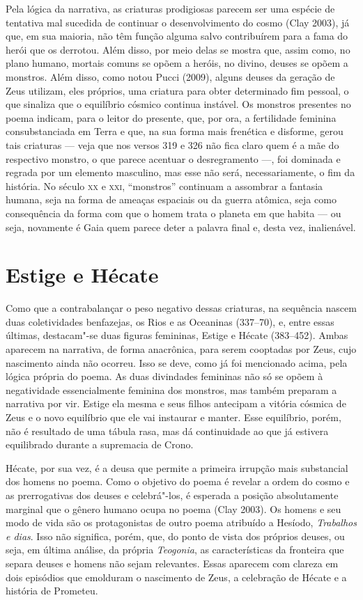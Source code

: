 Pela lógica da narrativa, as criaturas prodigiosas parecem ser uma
espécie de tentativa mal sucedida de continuar o desenvolvimento do
cosmo (Clay 2003), já que, em sua maioria, não têm função alguma salvo
contribuírem para a fama do herói que os derrotou. Além disso, por meio
delas se mostra que, assim como, no plano humano, mortais comuns se
opõem a heróis, no divino, deuses se opõem a monstros. Além disso, como
notou Pucci (2009), alguns deuses da geração de Zeus utilizam, eles
próprios, uma criatura para obter determinado fim pessoal, o que
sinaliza que o equilíbrio cósmico continua instável. Os monstros
presentes no poema indicam, para o leitor do presente, que, por ora, a
fertilidade feminina consubstanciada em Terra e que, na sua forma mais
frenética e disforme, gerou tais criaturas --- veja que nos versos 319 e
326 não fica claro quem é a mãe do respectivo monstro, o que parece
acentuar o desregramento ---, foi dominada e regrada por um elemento
masculino, mas esse não será, necessariamente, o fim da história. No
século \textsc{xx} e \textsc{xxi}, ``monstros'' continuam a assombrar a fantasia humana,
seja na forma de ameaças espaciais ou da guerra atômica, seja como
consequência da forma com que o homem trata o planeta em que habita ---
ou seja, novamente é Gaia quem parece deter a palavra final e, desta
vez, inalienável.

\section{Estige e Hécate}

Como que a contrabalançar o peso negativo dessas criaturas, na sequência
nascem duas coletividades benfazejas, os Rios e as Oceaninas (337--70),
e, entre essas últimas, destacam"-se duas figuras femininas, Estige e
Hécate (383--452). Ambas aparecem na narrativa, de forma anacrônica, para
serem cooptadas por Zeus, cujo nascimento ainda não ocorreu. Isso se
deve, como já foi mencionado acima, pela lógica própria do poema. As
duas divindades femininas não só se opõem à negatividade essencialmente
feminina dos monstros, mas também preparam a narrativa por vir. Estige
ela mesma e seus filhos antecipam a vitória cósmica de Zeus e o novo
equilíbrio que ele vai instaurar e manter. Esse equilíbrio, porém, não é
resultado de uma tábula rasa, mas dá continuidade ao que já estivera
equilibrado durante a supremacia de Crono.

Hécate, por sua vez, é a deusa que permite a primeira irrupção mais
substancial dos homens no poema. Como o objetivo do poema é revelar a
ordem do cosmo e as prerrogativas dos deuses e celebrá"-los, é esperada a
posição absolutamente marginal que o gênero humano ocupa no poema (Clay
2003). Os homens e seu modo de vida são os protagonistas de outro poema
atribuído a Hesíodo, \emph{Trabalhos e dias}. Isso não significa, porém,
que, do ponto de vista dos próprios deuses, ou seja, em última análise,
da própria \emph{Teogonia}, as características da fronteira que separa
deuses e homens não sejam relevantes. Essas aparecem com clareza em dois
episódios que emolduram o nascimento de Zeus, a celebração de Hécate e a
história de Prometeu.

